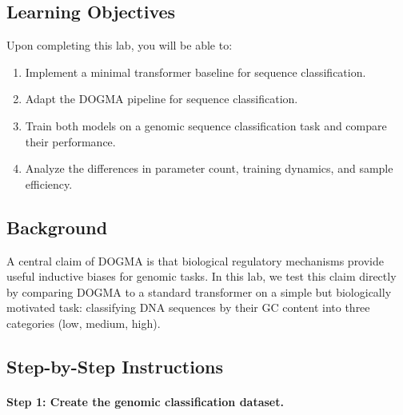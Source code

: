 \subsection{Learning Objectives}

Upon completing this lab, you will be able to:
\begin{enumerate}[leftmargin=1.8em]
  \item Implement a minimal transformer baseline for sequence classification.
  \item Adapt the DOGMA pipeline for sequence classification.
  \item Train both models on a genomic sequence classification task and compare their performance.
  \item Analyze the differences in parameter count, training dynamics, and sample efficiency.
\end{enumerate}

\subsection{Background}

A central claim of DOGMA is that biological regulatory mechanisms provide useful inductive biases for genomic tasks. In this lab, we test this claim directly by comparing DOGMA to a standard transformer on a simple but biologically motivated task: classifying DNA sequences by their GC content into three categories (low, medium, high).

\subsection{Step-by-Step Instructions}

\paragraph{Step 1: Create the genomic classification dataset.}

